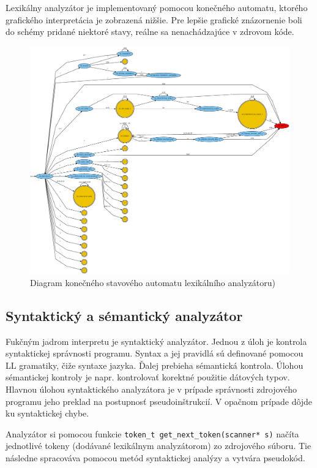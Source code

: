 \documentclass[12pt,a4paper,titlepage,final]{article}
\begin{document}
Lexikálny analyzátor je implementovaný pomocou konečného automatu, ktorého grafického
interpretácia je zobrazená nižšie. Pre lepšie grafické znázornenie boli do schémy pridané niektoré
stavy, reálne sa nenachádzajúce v zdrovom kóde.

\begin{figure}[]
  \centering
  \includegraphics[scale=0.25]{img/fsm.eps}
  \caption{Diagram konečného stavového automatu lexikálního analyzátoru)}
  \label{fig:fsm}
\end{figure}

\subsection{Syntaktický a sémantický analyzátor}

Fukčným jadrom interpretu je syntaktický analyzátor. Jednou z úloh je kontrola syntaktickej správnosti programu. Syntax a jej pravidlá sú definované pomocou LL gramatiky, čiže syntaxe jazyka. Ďalej prebieha sémantická kontrola. Úlohou sémantickej kontroly je napr. kontrolovať korektné použitie dátových typov. Hlavnou úlohou syntaktického analyzátora je v prípade správnosti zdrojového programu jeho preklad na postupnosť pseudoinštrukcií. V opačnom prípade dôjde ku syntaktickej chybe.

Analyzátor si pomocou funkcie \verb+token_t get_next_token(scanner* s)+ načíta jednotlivé tokeny (dodávané lexikálnym analyzátorom) zo zdrojového súboru. Tie následne spracováva pomocou metód syntaktickej analýzy a vytvára pseudokód.
\end{document}
